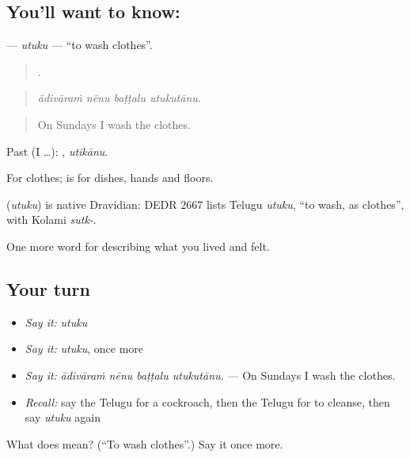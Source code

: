\subsection*{You'll want to know: }
\textbf{} — \emph{utuku} — \textquotedblleft{}to wash clothes\textquotedblright{}.

\begin{quote}
   .
\end{quote}

\begin{quote}
\emph{ādivāraṁ nēnu baṭṭalu utukutānu.}
\end{quote}

\begin{quote}
On Sundays I wash the clothes.
\end{quote}

Past (I …): , \emph{utikānu}.

For clothes;  is for dishes, hands and floors.

\begin{cousinweb}
\textbf{} (\emph{utuku}) is native Dravidian: DEDR 2667 lists Telugu \emph{utuku}, \textquotedblleft{}to wash, as clothes\textquotedblright{}, with Kolami \emph{sutk-}.
\end{cousinweb}

\begin{grammarlens}[title={What you've built}]
One more word for describing what you lived and felt.
\end{grammarlens}

\subsection*{Your turn}
\begin{itemize}
\raggedright
  \item \emph{Say it:} \emph{utuku}
  \item \emph{Say it:} \emph{utuku}, once more
  \item \emph{Say it:} \emph{ādivāraṁ nēnu baṭṭalu utukutānu.} — On Sundays I wash the clothes.
  \item \emph{Recall:} say the Telugu for a cockroach, then the Telugu for to cleanse, then say \emph{utuku} again
\end{itemize}

\begin{tcolorbox}[breakable,colback=teal!4,colframe=teal!35!black,title={Before you move on}]
What does  mean? (\textquotedblleft{}To wash clothes\textquotedblright{}.) Say it once more.
\end{tcolorbox}
